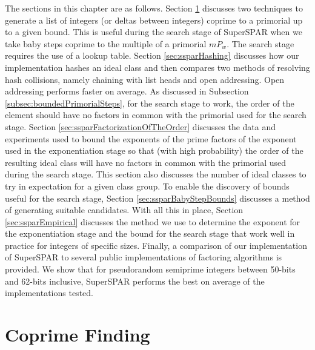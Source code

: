 \documentclass{ucalgthes1}
\theoremstyle{definition}
\begin{document}
The sections in this chapter are as follows.  Section \ref{sec:ssparCoprimeFinding} discusses two techniques to generate a list of integers (or deltas between integers) coprime to a primorial up to a given bound.  This is useful during the search stage of SuperSPAR when we take baby steps coprime to the multiple of a primorial $mP_w$.  The search stage requires the use of a lookup table.  Section \ref{sec:ssparHashing} discusses how our implementation hashes an ideal class and then compares two methods of resolving hash collisions, namely chaining with list heads and open addressing.  Open addressing performs faster on average.  As discussed in Subsection \ref{subsec:boundedPrimorialSteps}, for the search stage to work, the order of the element should have no factors in common with the primorial used for the search stage.  Section \ref{sec:ssparFactorizationOfTheOrder} discusses the data and experiments used to bound the exponents of the prime factors of the exponent used in the exponentiation stage so that (with high probability) the order of the resulting ideal class will have no factors in common with the primorial used during the search stage.  This section also discusses the number of ideal classes to try in expectation for a given class group.  To enable the discovery of bounds useful for the search stage, Section \ref{sec:ssparBabyStepBounds} discusses a method of generating suitable candidates.  With all this in place, Section \ref{sec:ssparEmpirical} discusses the method we use to determine the exponent for the exponentiation stage and the bound for the search stage that work well in practice for integers of specific sizes.  Finally, a comparison of our implementation of SuperSPAR to several public implementations of factoring algorithms is provided.  We show that for pseudorandom semiprime integers between 50-bits and 62-bits inclusive, SuperSPAR performs the best on average of the implementations tested.


\section{Coprime Finding}
\label{sec:ssparCoprimeFinding}

\end{document}
